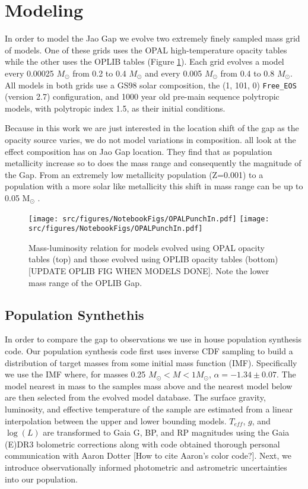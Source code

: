 \section{Modeling}\label{sec:modeling}
In order to model the Jao Gap we evolve two extremely finely sampled mass grid
of models. One of these grids uses the OPAL high-temperature opacity tables
while the other uses the OPLIB tables (Figure \ref{fig:PunchIn}). Each grid
evolves a model every 0.00025 $M_{\odot}$ from 0.2 to 0.4 $M_{\odot}$ and every
0.005 $M_{\odot}$ from 0.4 to 0.8 $M_{\odot}$. All models in both grids use a
GS98 solar composition, the (1, 101, 0) \texttt{Free\_EOS} (version
{\color{red}2.7}) configuration, and 1000 year old pre-main sequence polytropic
models, with polytropic index 1.5, as their initial conditions.

Because in this work we are just interested in the location shift of the gap as
the opacity source varies, we do not model variations in composition.
\citet{Mansfield2021,Jao2020,Feiden2021} all look at the effect composition has
on Jao Gap location. They find that as population metallicity increase so to
does the mass range and consequently the magnitude of the Gap. From an extremely
low metallicity population (Z=0.001) to a population with a more solar like
metallicity this shift in mass range can be up to 0.05 M$_{\odot}$
\citep{Mansfield2021}.

\begin{figure}
	\centering
	\texttt{[image: src/figures/NotebookFigs/OPALPunchIn.pdf]}
	\texttt{[image: src/figures/NotebookFigs/OPALPunchIn.pdf]}
	\caption{Mass-luminosity relation for models evolved using OPAL opacity
	tables (top) and those evolved using OPLIB opacity tables (bottom)
	{\color{red}[UPDATE OPLIB FIG WHEN MODELS DONE]}. Note the lower mass range
	of the OPLIB Gap.}
	\label{fig:PunchIn}
		
\end{figure}

\subsection{Population Synthethis}
In order to compare the gap to observations we use in house population
synthesis code. Our population synthesis code first uses inverse CDF sampling
to build a distribution of target masses from some initial mass function (IMF).
Specifically we use the \citet{Sollima2019} IMF where, for masses 0.25
$M_{\odot} < M < 1 M_{\odot}$, $\alpha=-1.34\pm0.07$. The model nearest in mass
to the samples mass above and the nearest model below are then selected from
the evolved model database. The surface gravity, luminosity, and effective
temperature of the sample are estimated from a linear interpolation between the
upper and lower bounding models. $T_{eff}$, $g$, and $\log(L)$ are transformed
to Gaia G, BP, and RP magnitudes using the Gaia (E)DR3 bolometric corrections
\citep{Creevey2022} along with code obtained thorough personal communication
with Aaron Dotter {\color{red}[How to cite Aaron's color code?]}. Next, we
introduce observationally informed photometric and astrometric uncertainties
into our population.

